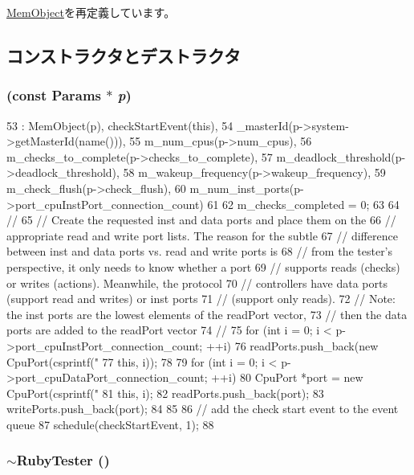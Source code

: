 \hyperlink{classMemObject_a905bbc621eeec0ed08859e21c8c95412}{MemObject}を再定義しています。

\subsection{コンストラクタとデストラクタ}
\hypertarget{classRubyTester_ae8f6793530023408995b1e046935c263}{
\subsubsection[{RubyTester}]{ (const {\bf Params} $\ast$ {\em p})}}
\label{classRubyTester_ae8f6793530023408995b1e046935c263}



\begin{DoxyCode}
53   : MemObject(p), checkStartEvent(this),
54     _masterId(p->system->getMasterId(name())),
55     m_num_cpus(p->num_cpus),
56     m_checks_to_complete(p->checks_to_complete),
57     m_deadlock_threshold(p->deadlock_threshold),
58     m_wakeup_frequency(p->wakeup_frequency),
59     m_check_flush(p->check_flush),
60     m_num_inst_ports(p->port_cpuInstPort_connection_count)
61 {
62     m_checks_completed = 0;
63 
64     //
65     // Create the requested inst and data ports and place them on the
66     // appropriate read and write port lists.  The reason for the subtle
67     // difference between inst and data ports vs. read and write ports is
68     // from the tester's perspective, it only needs to know whether a port
69     // supports reads (checks) or writes (actions).  Meanwhile, the protocol
70     // controllers have data ports (support read and writes) or inst ports
71     // (support only reads).
72     // Note: the inst ports are the lowest elements of the readPort vector,
73     // then the data ports are added to the readPort vector
74     //
75     for (int i = 0; i < p->port_cpuInstPort_connection_count; ++i) {
76         readPorts.push_back(new CpuPort(csprintf("%
77                                         this, i));
78     }
79     for (int i = 0; i < p->port_cpuDataPort_connection_count; ++i) {
80         CpuPort *port = new CpuPort(csprintf("%
81                                     this, i);
82         readPorts.push_back(port);
83         writePorts.push_back(port);
84     }
85 
86     // add the check start event to the event queue
87     schedule(checkStartEvent, 1);
88 }
\end{DoxyCode}
\hypertarget{classRubyTester_ac53d3f47921859fb0e3792c18c8643d7}{
\subsubsection[{$\sim$RubyTester}]{\setlength{\rightskip}{0pt plus 5cm}$\sim${\bf RubyTester} ()}}
\label{classRubyTester_ac53d3f47921859fb0e3792c18c8643d7}



